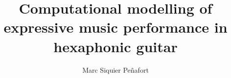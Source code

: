 




\title{Computational modelling of expressive music performance in hexaphonic guitar}
\author{Marc Siquier Peñafort}

\maketitle
\maketitle
\restoregeometry
\sloppy





\preface
\body











\cleardoublepage



